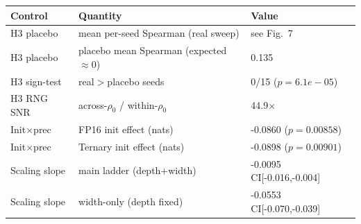 \begin{tabular}{lll}
\hline
Control & Quantity & Value \\
\hline
H3 placebo & mean per-seed Spearman (real sweep) & see Fig.~7 \\
H3 placebo & placebo mean Spearman (expected $\approx$0) & 0.135 \\
H3 sign-test & real$>$placebo seeds & 0/15 ($p=6.1e-05$) \\
H3 RNG SNR & across-$\rho_0$ / within-$\rho_0$ & 44.9$\times$ \\
Init$\times$prec & FP16 init effect (nats) & -0.0860 ($p=0.00858$) \\
Init$\times$prec & Ternary init effect (nats) & -0.0898 ($p=0.00901$) \\
Scaling slope & main ladder (depth+width) & -0.0095 CI[-0.016,-0.004] \\
Scaling slope & width-only (depth fixed) & -0.0553 CI[-0.070,-0.039] \\
\hline
\end{tabular}
